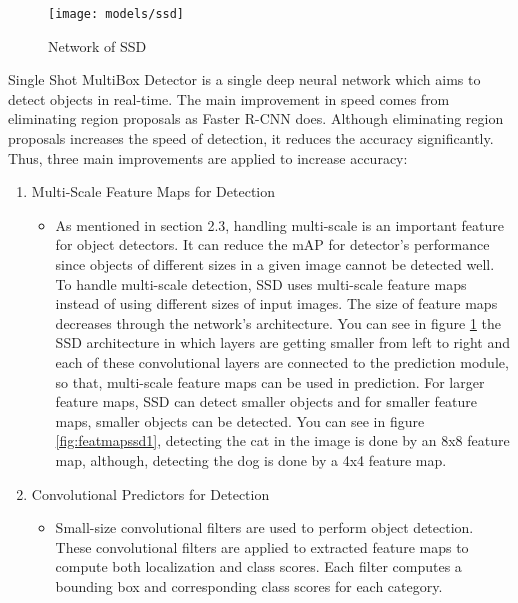 \documentclass{article}
\begin{document}
\setlength{\parindent}{6ex}

\begin{figure}
    \centering
    \texttt{[image: models/ssd]}
    \caption{Network of SSD}
    \label{fig:ssd1}
\end{figure}

\indent

Single Shot MultiBox Detector \cite{ssdcite} is a single deep neural network which aims to detect 
objects in real-time. The main improvement in speed comes from eliminating region 
proposals as Faster R-CNN does. Although eliminating region proposals increases 
the speed of detection, it reduces the accuracy significantly. Thus, three main 
improvements are applied to increase accuracy:

\begin{enumerate}
    \item Multi-Scale Feature Maps for Detection
    \begin{itemize}
        \item As mentioned in section 2.3, handling multi-scale is an important feature 
for object detectors. It can reduce the mAP for detector's performance since objects 
of different sizes in a given image cannot be detected well. To handle multi-scale detection, 
SSD uses multi-scale feature maps instead of using different sizes of input images. 
The size of feature maps decreases through the network's architecture. You can see in figure 
\ref{fig:ssd1} the SSD architecture in which layers are getting smaller from left to right and 
each of these convolutional layers are connected to the prediction module, so that, multi-scale 
feature maps can be used in prediction. For larger feature maps, SSD can detect smaller objects 
and for smaller feature maps, smaller objects can be detected. You can see in figure 
\ref{fig:featmapssd1}, detecting the cat in the image is done by an 8x8 feature map, although, detecting 
the dog is done by a 4x4 feature map.
    \end{itemize}
    \item Convolutional Predictors for Detection
    \begin{itemize}
        \item Small-size convolutional filters are used to perform object detection. 
        These convolutional filters are applied to extracted feature maps to compute 
        both localization and class scores. Each filter computes a bounding box and 
        corresponding class scores for each category.
    \end{itemize}

\end{enumerate}
\end{document}
